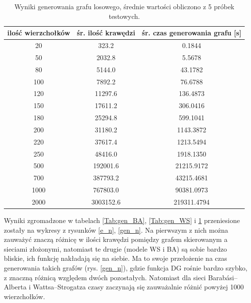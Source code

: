 \documentclass[a4paper, 12pt, twoside, openright]{article}
\begin{document}
\begin{table}[ht]
	\centering
	\caption{Wyniki generowania grafu losowego, średnie wartości obliczono z 5 próbek testowych.}

	\resizebox{14.5cm}{!}
	{
	\begin{tabular}{|c c c|}
		\hline
		ilość wierzchołków	& śr. ilość krawędzi 		& śr. czas generowania grafu [s]\\ \hline \hline
		20 	& 323.2  		& 0.1844 	\\ \hline
		50 	& 2032.8 		& 5.5678 	\\ \hline
		80 	& 5144.0        & 43.1782	\\ \hline
		100 & 7892.2        & 76.6788	\\ \hline
		120 & 11297.6       & 136.4873	\\ \hline
		150 & 17611.2 		& 306.0416	\\ \hline
		180 & 25294.8       & 599.1041	\\ \hline
		200 & 31180.2  		& 1143.3872	\\ \hline
		220 & 37617.4 		& 1213.5494	\\ \hline
		250 & 48416.0   	& 1918.1350	\\ \hline
		500 & 192001.6   	& 21215.9172\\ \hline				
		700 & 387793.2		& 43215.4681\\ \hline
		1000& 767803.0	    & 90381.0973\\ \hline
		2000& 3003152.6	  	& 219311.4794\\ \hline
	\end{tabular} 
	}
	\label{Tab:gen_DiG}
\end{table}



Wyniki zgromadzone w tabelach \ref{Tab:gen_BA}, \ref{Tab:gen_WS} i \ref{Tab:gen_DiG} przeniesione zostały na wykresy z rysunków \ref{e_n}, \ref{gen_n}. Na pierwszym z nich można zauważyć znaczą różnicę w ilości krawędzi pomiędzy grafem skierowanym a sieciami złożonymi, natomiast te drugie (modele WS i BA) są sobie bardzo bliskie, ich funkcję nakładają się na siebie. Ma to swoje przełożenie na czas generowania takich grafów (rys. \ref{gen_n}), gdzie funkcja DG rośnie bardzo szybko, z znaczną różnicą względem dwóch pozostałych. Natomiast dla sieci Barabási–Alberta i Wattsa–Strogatza czasy zaczynają się zauważalnie różnić powyżej 1000 wierzchołków.
\end{document}
